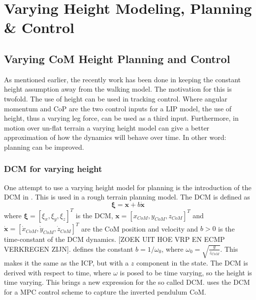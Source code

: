 %
\chapter{Varying Height Modeling, Planning \& Control}%
\section{Varying CoM Height Planning and Control}
As mentioned earlier, the recently work has been done in keeping the constant height assumption away from the walking model. The motivation for this is twofold. The use of height can be used in tracking control. Where angular momentum and \ac{CoP} are the two control inputs for a \ac{LIP} model, the use of height, thus a varying leg force, can be used as a third input. Furthermore, in motion over un-flat terrain a varying height model can give a better approximation of how the dynamics will behave over time. In other word: planning can be improved. 
\subsection{\ac{DCM} for varying height}
One attempt to use a varying height model for planning is the introduction of the \ac{DCM} in \cite{englsberger2013three}. This is used in a rough terrain planning model. The \ac{DCM} is defined as
\begin{equation}
\boldsymbol{\xi} = \boldsymbol{x} + b\boldsymbol{\dot{x}}
\end{equation}
where $\boldsymbol{\xi}=[\xi_x,\xi_y,\xi_z]^T$ is the \ac{DCM}, $\boldsymbol{x}=[x_{CoM}, y_{CoM}, z_{CoM}]^T$ and $\boldsymbol{\dot{x}}=[\dot{x}_{CoM}, \dot{y}_{CoM}, \dot{z}_{CoM}]^T$ are the \ac{CoM} position and velocity and $b>0$ is the time-constant of the \ac{DCM} dynamics. 
[ZOEK UIT HOE VRP EN ECMP VERKREGEN ZIJN].
\cite{hopkins2014humanoid} defines the constant $b=1/\omega_0$, where $\omega_0=\sqrt{\frac{g}{z_{CoM}}}$. This makes it the same as the \ac{ICP}, but with a $z$ component in the state. The \ac{DCM} is derived with respect to time, where $\omega$ is posed to be time varying, so the height is time varying. This brings a new expression for the so called \ac{DCM}.
\cite{caron2018capturability} uses the \ac{DCM} for a MPC control scheme to capture the inverted pendulum \ac{CoM}.

